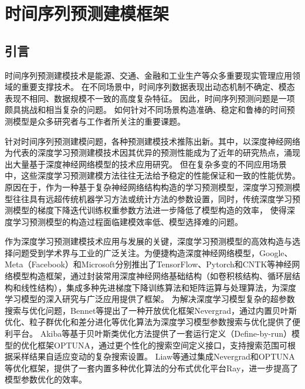 \chapter{时间序列预测建模框架
\label{sec:chapter.univ}
}
\section{引言}
时间序列预测建模技术是能源、交通、金融和工业生产等众多重要现实管理应用领域的重要支撑技术。
在不同场景中，时间序列数据表现出动态机制不确定、模态表现不相同、数据规模不一致的高度复杂特征。
因此，时间序列预测问题是一项颇具挑战和相当复杂的问题。
如何针对不同场景构造准确、稳定和鲁棒的时间预测模型是众多研究者与工作者所关注的重要课题。

针对时间序列预测建模问题，各种预测建模技术推陈出新。其中，以深度神经网络为代表的深度学习预测建模技术因其优异的预测性能成为了近年的研究热点，涌现出大量基于深度神经网络模型的技术应用研究\cite{wuImproved2019,zhaoDeep2017,sezerFinancial2020,caiDayahead2019,lindbergLongterm2019,shiDeep2018,laptevTimeseries2017,wangTraffic2016,xiaoShortterm2019}。
但在复杂多变的不同应用场景中，这些深度学习预测建模方法往往无法给予稳定的性能保证和一致的性能优势。
原因在于，作为一种基于复杂神经网络结构构造的学习预测模型，深度学习预测模型往往具有远超传统机器学习方法或统计方法的参数设置，同时，传统深度学习预测模型的梯度下降迭代训练权重参数方法进一步降低了模型构造的效率，
使得深度学习预测模型的构造过程面临建模效率低、模型选择难的问题。

作为深度学习预测建模技术应用与发展的关键，深度学习预测模型的高效构造与选择问题受到学术界与工业的广泛关注。为便捷构造深度神经网络模型，Google、Meta（Facebook）和Microsoft分别推出了TensorFlow\cite{abadiTensorflow2016}、Pytorch\cite{paszkePytorch2019}和CNTK\cite{seideCNTK2016}等神经网络模型构造框架，通过封装常用深度神经网络基础结构（如卷积核结构、循环层结构和线性结构），集成多种先进梯度下降训练算法和矩阵运算与处理算法，为深度学习模型的深入研究与广泛应用提供了框架。
为解决深度学习模型复杂的超参数搜索与优化问题，Bennet等\cite{bennetNevergrad2021}提出了一种开放优化框架Nevergrad，通过内置贝叶斯优化、粒子群优化和差分进化等优化算法为深度学习模型参数搜索与优化提供了便利平台。
Akiba等\cite{akibaOptuna2019}基于贝叶斯类优化方法提供了一套运行定义（Define-by-run）模型的优化框架OPTUNA，通过更个性化的搜索空间定义接口，支持搜索范围可根据采样结果自适应变动的复杂搜索设置。
Liaw等\cite{liawTune2018}通过集成Nevergrad和OPTUNA等优化框架，提供了一套内置多种优化算法的分布式优化平台Ray，进一步提高了模型参数优化的效率。

